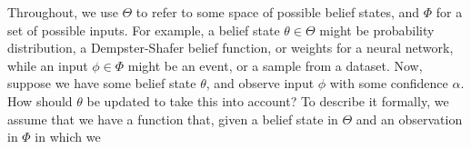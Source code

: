 \documentclass{uai2023} %
\begin{document}
Throughout, we use $\Theta$ to refer to some space of possible belief states,
and $\Phi$ for a set of possible inputs.
For example, a belief state $\theta \in \Theta$
might be probability distribution,
a Dempster-Shafer belief function, or
weights for a neural network,
while an input $\phi \in \Phi$ might be an event, or a sample from a dataset.
%
%
Now, suppose we have some belief state $\theta$, and observe input
$\phi$ with some confidence $\alpha$.
How should $\theta$ be updated to take this into account?
To describe it formally, we assume that we have a function that, given
a belief state in $\Theta$ and an observation in $\Phi$ in which we
\end{document}
